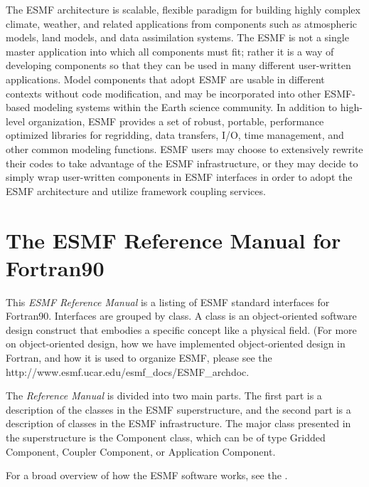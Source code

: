 The ESMF architecture is scalable, flexible paradigm for building highly 
complex climate, weather, and related applications from components such
as atmospheric models, land models, and data assimilation systems.  The 
ESMF is not a single master application into which all components must fit; 
rather it is a way of developing components so that they can be used 
in many different user-written applications.  Model components that adopt 
ESMF are usable in different contexts without code modification, and may be
incorporated into other ESMF-based modeling systems within the Earth 
science community.  In addition to high-level organization, ESMF provides 
a set of robust, portable, performance optimized libraries for regridding, 
data transfers, I/O, time management, and other common modeling functions.  
ESMF users may choose to extensively rewrite their codes to take advantage 
of the ESMF infrastructure, or they may decide to simply wrap user-written 
components in ESMF interfaces in order to adopt the ESMF architecture and 
utilize framework coupling services.

\section{The ESMF Reference Manual for Fortran90}

This {\it ESMF Reference Manual} is a listing of ESMF standard interfaces
for Fortran90.  Interfaces are grouped by class.  A class is an 
object-oriented software design construct that embodies a specific 
concept like a physical field.  (For more on object-oriented
design, how we have implemented object-oriented design in Fortran, and 
how it is used to organize 
ESMF, please see the 
{http://www.esmf.ucar.edu/esmf_docs/ESMF_archdoc}.

The {\it Reference Manual} is divided into two main parts.  The 
first part is a description 
of the classes in the ESMF superstructure, and the second part is a 
description of classes in the ESMF infrastructure.  The major class
presented in the superstructure is the Component class, which can 
be of type Gridded Component, Coupler Component, or Application Component.


For a broad overview of how the ESMF software works, see the 
.














